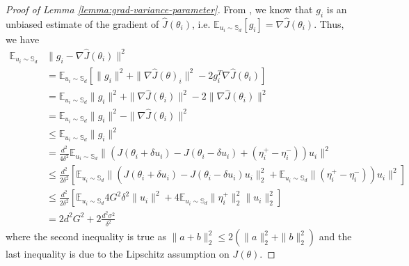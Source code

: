 \begin{proof}[Proof of Lemma \ref{lemma:grad-variance-parameter}]
  From \cite{shamir2017optimal}, we know that $g_i$ is an unbiased estimate of the gradient of $\hat{J}(\theta_i)$, i.e. $\mathbb{E}_{u_i \sim \mathbb{S}_d}[g_i] = \nabla\hat{J}(\theta_i)$. Thus, we have
\begin{align*}
    \mathbb{E}_{u_i \sim \mathbb{S}_d}&\|g_i -
      \nabla\hat{J}(\theta_i)\|^2 \\
      &= \mathbb{E}_{u_i \sim \mathbb{S}_d}[\|g_i\|^2 + \|\nabla \hat{J}(\theta)_i\|^2 - 2g_i^T\nabla \hat{J}(\theta_i)] \\
    &= \mathbb{E}_{u_i \sim \mathbb{S}_d}\|g_i\|^2 + \|\nabla \hat{J}(\theta_i)\|^2 - 2\|\nabla \hat{J}(\theta_i)\|^2 \\
    &= \mathbb{E}_{u_i \sim \mathbb{S}_d}\|g_i\|^2 - \|\nabla \hat{J}(\theta_i)\|^2 \\
    &\leq \mathbb{E}_{u_i \sim \mathbb{S}_d}\|g_i\|^2 \\
    &= \frac{d^2}{4\delta^2}\mathbb{E}_{u_i \sim
      \mathbb{S}_d}\|(J(\theta_i + \delta u_i) - J(\theta_i - \delta
      u_i) + (\eta_i^+ - \eta_i^-))u_i\|^2 \\
  &\leq \frac{d^2}{2\delta^2}[\mathbb{E}_{u_i \sim \mathbb{S}_d}\|(J(\theta_i + \delta u_i) - J(\theta_i - \delta
    u_i)u_i\|_2^2 + \mathbb{E}_{u_i \sim \mathbb{S}_d}\|(\eta_i^+ -
    \eta_i^-))u_i\|^2] \\
    &\leq \frac{d^2}{2\delta^2}[\mathbb{E}_{u_i \sim \mathbb{S}_d}
      4G^2\delta^2 \|u_i\|^2 +  4\mathbb{E}_{u_i \sim
      \mathbb{S}_d}\|\eta_i^+\|_2^2 \|u_i\|_2^2]\\
    &= 2d^2G^2  + 2\frac{d^2\sigma^2}{\delta^2}
\end{align*}
where the second inequality is true as $\|a+b\|_2^2 \leq 2(\|a\|_2^2 +
\|b\|_2^2)$ and the last inequality is due to the Lipschitz assumption
on $J(\theta)$.
\end{proof}

